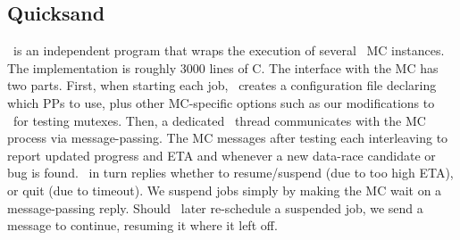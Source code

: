 \subsection{Quicksand}

\quicksand~is an independent program that wraps the execution of several \landslide~MC instances.
The implementation is roughly 3000 lines of C.
The interface with the MC has two parts. %
First, when starting each job, \quicksand~creates a configuration file declaring which PPs to use,
plus other MC-specific options such as our modifications to \landslide~for testing mutexes. %
Then, a dedicated \quicksand~thread communicates with the MC process via message-passing. %
The MC messages after testing each interleaving to report updated progress and ETA
and whenever a new data-race candidate or bug is found.
\quicksand~in turn replies whether to resume/suspend (due to too high ETA), or quit (due to timeout).
We suspend jobs simply by making the MC wait on a message-passing reply.
Should \quicksand~later re-schedule a suspended job, we send a message to continue,
resuming it where it left off.
